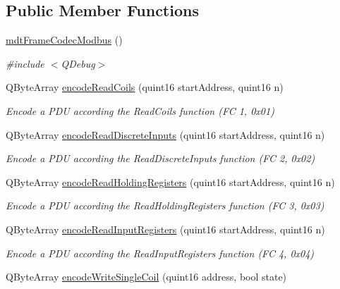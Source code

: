 \subsection*{Public Member Functions}
\begin{DoxyCompactItemize}
\item 
\hypertarget{classmdt_frame_codec_modbus_a42e71f7bff4e4caabe140a27bdf258f4}{
\hyperlink{classmdt_frame_codec_modbus_a42e71f7bff4e4caabe140a27bdf258f4}{mdtFrameCodecModbus} ()}
\label{classmdt_frame_codec_modbus_a42e71f7bff4e4caabe140a27bdf258f4}

\begin{DoxyCompactList}\small\item\em \#include $<$QDebug$>$ \end{DoxyCompactList}\item 
QByteArray \hyperlink{classmdt_frame_codec_modbus_adf0a4d583aeff7b818dda94514c594f0}{encodeReadCoils} (quint16 startAddress, quint16 n)
\begin{DoxyCompactList}\small\item\em Encode a PDU according the ReadCoils function (FC 1, 0x01) \end{DoxyCompactList}\item 
QByteArray \hyperlink{classmdt_frame_codec_modbus_ad14a2d6c124cca157670595978e06150}{encodeReadDiscreteInputs} (quint16 startAddress, quint16 n)
\begin{DoxyCompactList}\small\item\em Encode a PDU according the ReadDiscreteInputs function (FC 2, 0x02) \end{DoxyCompactList}\item 
QByteArray \hyperlink{classmdt_frame_codec_modbus_a19cac6dd7bd9078c6ab53ee2a891e537}{encodeReadHoldingRegisters} (quint16 startAddress, quint16 n)
\begin{DoxyCompactList}\small\item\em Encode a PDU according the ReadHoldingRegisters function (FC 3, 0x03) \end{DoxyCompactList}\item 
QByteArray \hyperlink{classmdt_frame_codec_modbus_aabcadb20524749274eaf285561960aed}{encodeReadInputRegisters} (quint16 startAddress, quint16 n)
\begin{DoxyCompactList}\small\item\em Encode a PDU according the ReadInputRegisters function (FC 4, 0x04) \end{DoxyCompactList}\item 
QByteArray \hyperlink{classmdt_frame_codec_modbus_a123f63422bb34fcb10ac653c0e89e79e}{encodeWriteSingleCoil} (quint16 address, bool state)

\end{DoxyCompactItemize}
